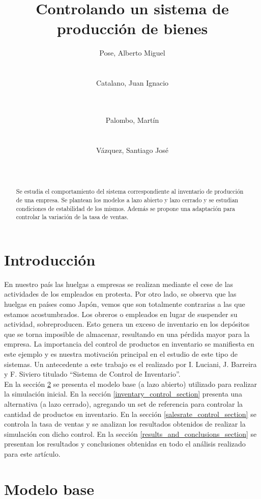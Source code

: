 \documentclass{sig-alternate}
\title{Controlando un sistema de producción de bienes}
\author{
\alignauthor
Pose, Alberto Miguel\\
       \affaddr{Instituto Tecnológico de Buenos Aires}\\
       \affaddr{Buenos Aires, Argentina}\\
       \email{apose@alu.itba.edu.ar}
\alignauthor
Catalano, Juan Ignacio\\
       \affaddr{Instituto Tecnológico de Buenos Aires}\\
       \affaddr{Buenos Aires, Argentina}\\
       \email{jcatalan@alu.itba.edu.ar}
\and
\alignauthor 
Palombo, Martín\\
       \affaddr{Instituto Tecnológico de Buenos Aires}\\
       \affaddr{Buenos Aires, Argentina}\\
       \email{mpalombo@alu.itba.edu.ar}
\alignauthor 
Vázquez, Santiago José\\
       \affaddr{Instituto Tecnológico de Buenos Aires}\\
       \affaddr{Buenos Aires, Argentina}\\
       \email{savazque@alu.itba.edu.ar}
}
\date{}
\begin{document}
\maketitle

\begin{abstract}
Se estudia el comportamiento del sistema correspondiente al inventario de producción de una empresa. Se plantean los modelos a lazo abierto y
lazo cerrado y se estudian condiciones de estabilidad de los mismos. Además se propone una adaptación para controlar la variación de la tasa
de ventas.
\end{abstract}

\section{Introducción}
\label{intro_section}
En nuestro país las huelgas a empresas se realizan median\-te el cese de las actividades de los empleados en protesta. Por otro
lado, se observa que las huelgas en países como Japón, vemos que son totalmente contrarias a las que estamos acostumbrados. Los obreros o empleados
en lugar de suspender su actividad, sobreproducen. Esto genera un exceso de inventario en los depósitos que se torna imposible de almacenar,
resultando en una pérdida mayor para la empresa. La importancia del control de productos en inventario se manifiesta en este
ejemplo y es nuestra motivación principal en el estudio de este tipo de sistemas. Un antecedente a este trabajo es el realizado por I. Luciani, J. Barreira y
F. Siviero titulado ``Sistema de Control de Inventario''\cite{iluciani}.\\ 
En la sección \ref{model_section} se presenta el modelo base (a lazo abierto) utilizado para realizar la simulación inicial. En la sección \ref{inventary_control_section} 
presenta una alternativa (a lazo cerrado), agregando un set de referencia para controlar la cantidad de productos en inventario. En la sección 
\ref{salesrate_control_section} se controla la tasa de ventas y se analizan los resultados obtenidos de realizar la simulación con dicho 
control. En la sección \ref{results_and_conclusions_section} se presentan los resultados y conclusiones obtenidas en todo el análisis 
realizado para este artículo.

\section{Modelo base}
\label{model_section}
\end{document}
